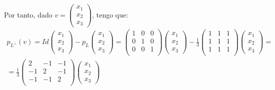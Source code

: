 \begin{ejercicio}
\begin{enumerate}
        Por tanto, dado $v=\left(\begin{array}{c}
                 x_1 \\ x_2 \\ x_3
            \end{array}\right)$, tengo que:
        \begin{multline*}
            p_{L^\perp}(v)=Id\left(\begin{array}{c}
                 x_1 \\ x_2 \\ x_3
            \end{array}\right) -p_L\left(\begin{array}{c}
                 x_1 \\ x_2 \\ x_3
            \end{array}\right)
            = \left(\begin{array}{ccc}
                 1 & 0 & 0 \\
                 0 & 1 & 0 \\
                 0 & 0 & 1 \\
            \end{array}\right)\left(\begin{array}{c}
                 x_1 \\ x_2 \\ x_3
            \end{array}\right)
             -\frac{1}{3}\left(\begin{array}{ccc}
                 1 & 1 & 1 \\
                 1 & 1 & 1 \\
                 1 & 1 & 1 \\
            \end{array}\right)\left(\begin{array}{c}
                 x_1 \\ x_2 \\ x_3
            \end{array}\right)
            =\\= \frac{1}{3}\left(\begin{array}{ccc}
                 2 & -1 & -1 \\
                 -1 & 2 & -1 \\
                 -1 & -1 & 2 \\
            \end{array}\right)\left(\begin{array}{c}
                 x_1 \\ x_2 \\ x_3
            \end{array}\right)
        \end{multline*}


\end{enumerate}
\end{ejercicio}
